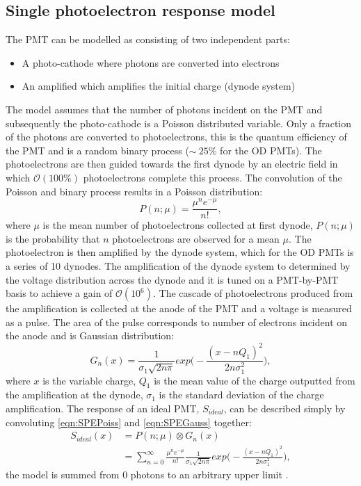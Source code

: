 \subsection{Single photoelectron response model}\label{sec:ODComissioning/SPhEResponse}
The PMT can be modelled as consisting of two independent parts:
\begin{itemize}
    \item A photo-cathode where photons are converted into electrons
    \item An amplified which amplifies the initial charge (dynode system)
\end{itemize}
The model \cite{BELLAMY1994468} assumes that the number of photons incident on the PMT and subsequently the photo-cathode is a Poisson distributed variable. Only a fraction of the photons are converted to photoelectrons, this is the quantum efficiency of the PMT and is a random binary process ($\sim~25\%$ for the OD PMTs). The photoelectrons are then guided towards the first dynode by an electric field in which $\mathcal{O}(100\%)$ photoelectrons complete this process. The convolution of the Poisson and binary process results in a Poisson distribution:
\begin{equation}\label{eqn:SPEPoiss}
    P(n;\mu)=\frac{\mu^{n}e^{-\mu}}{n!},
\end{equation}
where $\mu$ is the mean number of photoelectrons collected at first dynode, $P(n;\mu)$ is the probability that $n$ photoelectrons are observed for a mean $\mu$.
The photoelectron is then amplified by the dynode system, which for the OD PMTs is a series of 10 dynodes. The amplification of the dynode system to determined by the voltage distribution across the dynode and it is tuned on a PMT-by-PMT basis to achieve a gain of $\mathcal{O}(10^6)$. The cascade of photoelectrons produced from the amplification is collected at the anode of the PMT and a voltage is measured as a pulse. The area of the pulse corresponds to number of electrons incident on the anode and is Gaussian distribution:
\begin{equation}\label{eqn:SPEGauss}
    G_n(x)=\frac{1}{\sigma_1\sqrt{2n\pi}}exp\biggl(-\frac{(x-nQ_1)^2}{2n\sigma_1^2}\biggl),
\end{equation}
where $x$ is the variable charge, $Q_1$ is the mean value of the charge outputted from the amplification at the dynode, $\sigma_1$ is the standard deviation of the charge amplification.
The response of an ideal PMT, $S_{ideal}$, can be described simply by convoluting \autoref{eqn:SPEPoiss} and \autoref{eqn:SPEGauss} together:
\begin{equation}
    \begin{split}
    S_{ideal}(x) & = P(n;\mu)\otimes G_n(x) \\
    & = \sum^\infty_{n=0}\frac{\mu^{n}e^{-\mu}}{n!}\frac{1}{\sigma_1\sqrt{2n\pi}}exp\biggl(-\frac{(x-nQ_1)^2}{2n\sigma_1^2}\biggl),
    \end{split}
    \label{eqn:PoisPlusGauss}
\end{equation}
the model is summed from 0 photons to an arbitrary upper limit \cite{BELLAMY1994468}.
